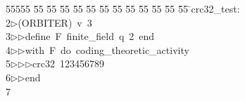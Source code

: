 %
%
\begin{tabbing}
55555 \= 55 \= 55 \= 55 \= 55 \= 55 \= 55 \= 55 \= 55 \= 55 \= 55 \= 55 \= 55 \= \>crc32\_test:\\[0pt]
2\>$\triangleright$\>(ORBITER)\ v\ 3\ \\[0pt]
3\>$\triangleright$\>$\triangleright$\>define\ F\ finite\_field\ q\ 2\ end\ \\[0pt]
4\>$\triangleright$\>$\triangleright$\>with\ F\ do\ coding\_theoretic\_activity\ \\[0pt]
5\>$\triangleright$\>$\triangleright$\>$\triangleright$\>crc32\ 123456789\ \\[0pt]
6\>$\triangleright$\>$\triangleright$\>end\\[0pt]
7\>\end{tabbing}
